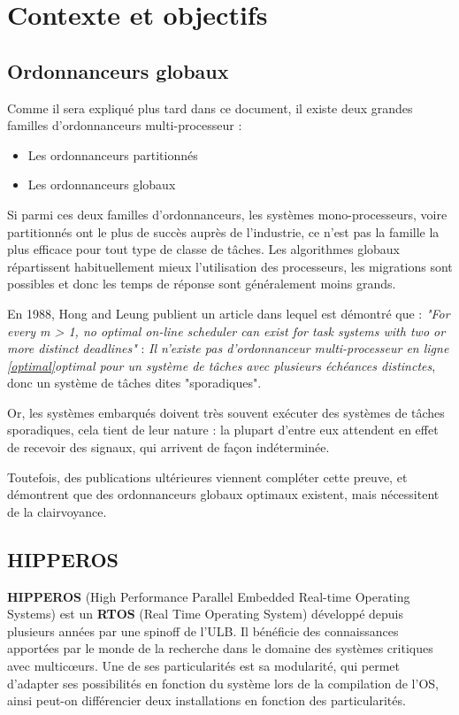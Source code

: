 \documentclass[11pt,a4paper,oneside]{report}
\begin{document}
	\section{Contexte et objectifs}
	
	\subsection{Ordonnanceurs globaux}
	Comme il sera expliqué plus tard dans ce document, il existe deux grandes familles d'ordonnanceurs 
	multi-processeur :\medskip
	\begin{itemize}
		\item Les ordonnanceurs partitionnés
		\item Les ordonnanceurs globaux
	\end{itemize}
	Si parmi ces deux familles d'ordonnanceurs, les systèmes mono-processeurs, voire 
	partitionnés ont le plus de succès auprès de l'industrie, 
	ce n'est pas la famille la plus efficace pour tout type de classe de tâches. 
	Les algorithmes globaux répartissent habituellement mieux l'utilisation des processeurs, 
	les migrations sont possibles et donc les temps de réponse sont généralement moins grands.
	\medskip
	
	
	En 1988, Hong and Leung \cite{hong_-line_1988} publient un article dans lequel est 
	démontré que : \medskip
	\textit{"For every m > 1, no optimal on-line scheduler can exist for task systems with two or more distinct deadlines"} : 
	\textit{Il n'existe pas d'ordonnanceur multi-processeur en ligne \ref{optimal}{optimal} pour un système de tâches 
		avec plusieurs échéances distinctes}, donc un système de tâches dites "sporadiques".
	
	Or, les systèmes embarqués doivent très souvent exécuter des systèmes de tâches sporadiques, 
	cela tient de leur nature : la plupart d'entre eux attendent en effet de recevoir des 
	signaux, qui arrivent de façon indéterminée.
	
	Toutefois, des publications ultérieures viennent compléter cette preuve, et démontrent 
	que des ordonnanceurs globaux optimaux existent, mais nécessitent de la clairvoyance.
	
	
	
	
	\subsection{HIPPEROS}
	\textbf{HIPPEROS} (High Performance Parallel Embedded Real-time Operating Systems)
	est un \textbf{RTOS} (Real Time Operating System) développé depuis plusieurs années par une spinoff de l'ULB.
	Il bénéficie des connaissances apportées par le monde de la recherche dans 
	le domaine des systèmes critiques avec multic\oe{}urs. Une de ses particularités 
	est sa modularité, qui permet d'adapter ses possibilités en fonction du système 
	lors de la compilation de l'OS, ainsi peut-on différencier deux installations 
	en fonction des particularités.
	
\end{document}
